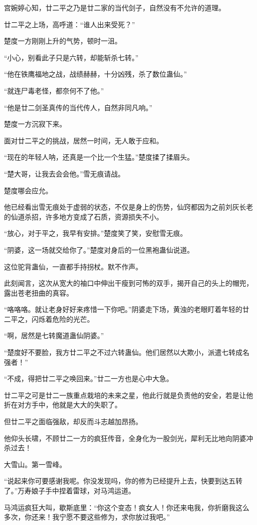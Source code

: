 \begin{this_body}
宫婉婷心知，廿二平之乃是廿二家的当代剑子，自然没有不允许的道理。

廿二平之上场，高呼道：“谁人出来受死？”

楚度一方刚刚上升的气势，顿时一沮。

“小心，别看此子只是六转，却能斩杀七转。”

“他在铁鹰福地之战，战绩赫赫，十分凶残，杀了数位蛊仙。”

“就连尸毒老怪，都奈何不了他。”

“他是廿二剑圣真传的当代传人，自然非同凡响。”

楚度一方沉寂下来。

面对廿二平之的挑战，居然一时间，无人敢于应和。

“现在的年轻人呐，还真是一个比一个生猛。”楚度揉了揉眉头。

“楚大哥，让我去会会他。”雪无痕请战。

楚度哪会应允。

他已经看出雪无痕处于虚弱的状态，不仅是身上的伤势，仙窍都因为之前刘灰长老的仙道杀招，许多地方变成了石质，资源损失不小。

“放心，对于平之，我早有安排。”楚度笑了笑，安慰雪无痕。

“阴婆，这一场就交给你了。”楚度对身后的一位黑袍蛊仙说道。

这位驼背蛊仙，一直都手持拐杖。默不作声。

此刻闻言，这次从宽大的袖口中伸出干瘦到可怖的双手，揭开自己的头上的帽兜，露出苍老扭曲的真容。

“咯咯咯。就让老身好好来疼惜一下你吧。”阴婆走下场，黄浊的老眼盯着年轻的廿二平之，闪烁着危险的光芒。

“啊，居然是七转魔道蛊仙阴婆。”

“楚度好不要脸，我方廿二平之不过六转蛊仙。他们居然以大欺小，派遣七转成名强者！”

“不成，得把廿二平之唤回来。”廿二一方也是心中大急。

廿二平之可是廿二一族重点栽培的未来之星，他此行就是负责他的安全，若是让他折在对方手中，他就是大大的失职了。

但廿二平之面临强敌，却反而斗志越加昂扬。

他仰头长啸，不顾廿二一方的疯狂传音，全身化为一股剑光，犀利无比地向阴婆冲杀过去！

大雪山。第一雪峰。

“说起来你可要感谢我呢。你没发现吗，你的修为已经提升上去，快要到达五转了。”万寿娘子手中捏着雷球，对马鸿运道。

马鸿运疯狂大叫，歇斯底里：“你这个变态！疯女人！你还来电我，你折磨我这么多次，你还来！我宁愿不要这些修为，求你放过我吧。”


\end{this_body}
